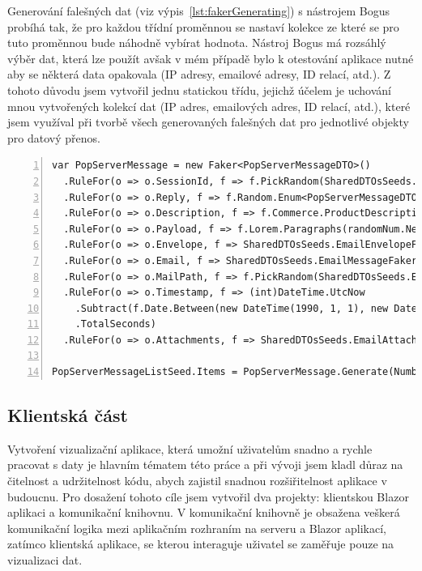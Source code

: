             Generování falešných dat (viz výpis~\ref{lst:fakerGenerating}) s nástrojem Bogus probíhá tak, že pro každou třídní proměnnou se nastaví kolekce ze které se pro tuto proměnnou bude náhodně vybírat hodnota. Nástroj Bogus má rozsáhlý výběr dat, která lze použít avšak v mém případě bylo k otestování aplikace nutné aby se některá data opakovala (IP adresy, emailové adresy, ID relací, atd.). Z tohoto důvodu jsem vytvořil jednu statickou třídu, jejichž účelem je uchování mnou vytvořených kolekcí dat (IP adres, emailových adres, ID relací, atd.), které jsem využíval při tvorbě všech generovaných falešných dat pro jednotlivé objekty pro datový přenos.


\begin{lstlisting}[numbers=left, firstnumber=1, caption={Ukázka tvorby falešných dat pro objekt sloužící k datovému přenosu „PopServerMessageDTO“ pomocí nástroje Bogus.}, label={lst:fakerGenerating}]
var PopServerMessage = new Faker<PopServerMessageDTO>()
  .RuleFor(o => o.SessionId, f => f.PickRandom(SharedDTOsSeeds.GuidArray))
  .RuleFor(o => o.Reply, f => f.Random.Enum<PopServerMessageDTO.ReplyEnum>())
  .RuleFor(o => o.Description, f => f.Commerce.ProductDescription())
  .RuleFor(o => o.Payload, f => f.Lorem.Paragraphs(randomNum.Next(1, 5)))
  .RuleFor(o => o.Envelope, f => SharedDTOsSeeds.EmailEnvelopeFaker.Generate(1)[0])
  .RuleFor(o => o.Email, f => SharedDTOsSeeds.EmailMessageFaker.Generate(1)[0])
  .RuleFor(o => o.MailPath, f => f.PickRandom(SharedDTOsSeeds.EmailPath))
  .RuleFor(o => o.Timestamp, f => (int)DateTime.UtcNow
    .Subtract(f.Date.Between(new DateTime(1990, 1, 1), new DateTime(2022, 1, 1)))
    .TotalSeconds)
  .RuleFor(o => o.Attachments, f => SharedDTOsSeeds.EmailAttachmentFaker.Generate(randomNum.Next(0, 15)));

PopServerMessageListSeed.Items = PopServerMessage.Generate(NumberOfPopClientMessages);
\end{lstlisting} 

    \subsection{Klientská část}
      Vytvoření vizualizační aplikace, která umožní uživatelům snadno a rychle pracovat s daty je hlavním tématem této práce a při vývoji jsem kladl důraz na čitelnost a udržitelnost kódu, abych zajistil snadnou rozšiřitelnost aplikace v budoucnu. Pro dosažení tohoto cíle jsem vytvořil dva projekty: klientskou Blazor aplikaci a komunikační knihovnu. V komunikační knihovně je obsažena veškerá komunikační logika mezi aplikačním rozhraním na serveru a Blazor aplikací, zatímco klientská aplikace, se kterou interaguje uživatel se zaměřuje pouze na vizualizaci dat.

